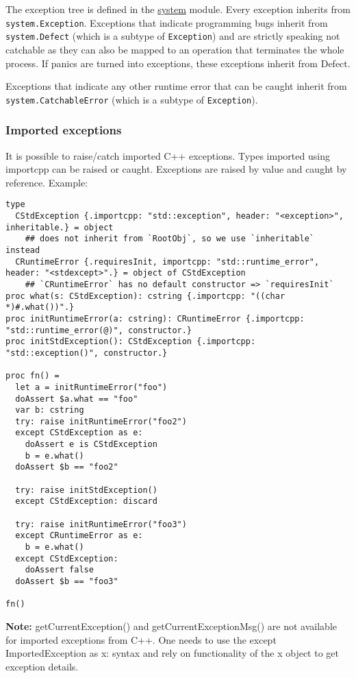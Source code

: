 The exception tree is defined in the \href{system.html}{system} module.
Every exception inherits from \texttt{system.Exception}. Exceptions that
indicate programming bugs inherit from \texttt{system.Defect} (which is
a subtype of \texttt{Exception}) and are strictly speaking not catchable
as they can also be mapped to an operation that terminates the whole
process. If panics are turned into exceptions, these exceptions inherit
from {Defect}.

Exceptions that indicate any other runtime error that can be caught
inherit from \texttt{system.CatchableError} (which is a subtype of
\texttt{Exception}).

\hypertarget{imported-exceptions}{%
\subsubsection{Imported exceptions}\label{imported-exceptions}}

It is possible to raise/catch imported C++ exceptions. Types imported
using {importcpp} can be raised or caught. Exceptions are raised by
value and caught by reference. Example:

\begin{verbatim}
type
  CStdException {.importcpp: "std::exception", header: "<exception>", inheritable.} = object
    ## does not inherit from `RootObj`, so we use `inheritable` instead
  CRuntimeError {.requiresInit, importcpp: "std::runtime_error", header: "<stdexcept>".} = object of CStdException
    ## `CRuntimeError` has no default constructor => `requiresInit`
proc what(s: CStdException): cstring {.importcpp: "((char *)#.what())".}
proc initRuntimeError(a: cstring): CRuntimeError {.importcpp: "std::runtime_error(@)", constructor.}
proc initStdException(): CStdException {.importcpp: "std::exception()", constructor.}

proc fn() =
  let a = initRuntimeError("foo")
  doAssert $a.what == "foo"
  var b: cstring
  try: raise initRuntimeError("foo2")
  except CStdException as e:
    doAssert e is CStdException
    b = e.what()
  doAssert $b == "foo2"

  try: raise initStdException()
  except CStdException: discard

  try: raise initRuntimeError("foo3")
  except CRuntimeError as e:
    b = e.what()
  except CStdException:
    doAssert false
  doAssert $b == "foo3"

fn()
\end{verbatim}

\textbf{Note:} {getCurrentException()} and {getCurrentExceptionMsg()}
are not available for imported exceptions from C++. One needs to use the
{except ImportedException as x:} syntax and rely on functionality of the
{x} object to get exception details.


